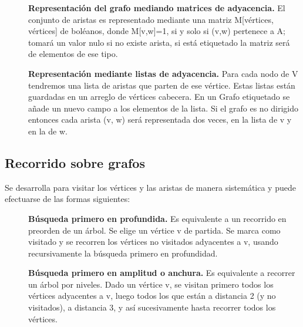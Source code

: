 \begin{description}
    \item[ ]\textbf{Representación del grafo mediando matrices de adyacencia.} El conjunto de aristas es representado mediante una matriz M[vértices, vértices] de boléanos, donde M[v,w]=1, si y solo si (v,w) pertenece a A; tomará un valor nulo si no existe arista, si está etiquetado la matriz será de elementos de ese tipo.
    \item[ ]\textbf{Representación mediante listas de adyacencia.} Para cada nodo de V tendremos una lista de aristas que parten de ese vértice. Estas listas están guardadas en un arreglo de vértices cabecera. En un Grafo etiquetado se añade un nuevo campo a los elementos de la lista. Si el grafo es no dirigido entonces cada arista (v, w) será representada dos veces, en la lista de v y en la de w.
\end{description}

\subsection*{Recorrido sobre grafos}
\noindent Se desarrolla para visitar los vértices y las aristas de manera sistemática y puede efectuarse de las formas siguientes:
\begin{description}
    \item[]\textbf{Búsqueda primero en profundida.} Es equivalente a un recorrido en preorden de un árbol. Se elige un vértice v de partida. Se marca como visitado y se recorren los vértices no visitados adyacentes a v, usando recursivamente la búsqueda primero en profundidad.
    \item[ ]\textbf{Búsqueda primero en amplitud o anchura.} Es equivalente a recorrer un árbol por niveles. Dado un vértice v, se visitan primero todos los vértices adyacentes a v, luego todos los que están a distancia 2 (y no visitados), a distancia 3, y así sucesivamente hasta recorrer todos los vértices.
\end{description}

